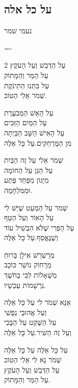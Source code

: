 \documentclass[11pt,twoside]{article}
\newcommand{\instruction}[1]{%
\ifhmode\else\noindent\fi%
{\plain\tiny{#1}}%
}
\begin{document}
{\newpage

\subsection{על כל אלה}
\vspace{-\baselineskip}%
{\centering\instruction{נעמי שמר}\par}
{%
{%
\setlength{\columnseprule}{0.4pt}%
\setlength{\columnsep}{1.8em}%
\lineskiplimit=-\maxdimen%
\begin{multicols}{2}
עַל הַדְּבַשׁ וְעַל הָעֹקֶץ\\
עַל הַמַּר וְהַמָּתוֹק\\
עַל בִּתֵּנוּ הַתִּינֹקֶת\\
שְׁמֹר אֵלִי הַטּוֹב.

עַל הָאֵשׁ הַמְּבֹעֶרֶת\\
עַל הַמַּיִם הַזַּכִּים\\
עַל הָאִישׁ הַשָּׁב הַבַּיְתָה\\
מִן הַמֶּרְחַקִּים.\hfill{\scriptsize עַל כָּל אֵלֶּה}

שְׁמֹר אֵלִי עַל זֶה הַבַּיִת\\
עַל הַגַּן עַל הַחוֹמָה\\
מִיָּגוֹן מִפַּחַד פֶּתַע\\
וּמִמִּלְחָמָה.

שְׁמֹר עַל הַמְּעַט שֶׁיֵּשׁ לִי\\
עַל הָאוֹר וְעַל הַטַּף\\
עַל הַפְּרִי שֶׁלֹּא הִבְשִׁיל עוֹד\\
וְשֶׁנֶּאֱסַף.\hfill{\scriptsize עַל כָּל אֵלֶּה}

מְרַשְׁרֵשׁ אִילָן בָּרוּחַ\\
מֵרָחוֹק נוֹשֵׁר כּוֹכָב\\
מִשְׁאָלוֹת לִבִּי בַּחֹשֶׁךְ\\
נִרְשָׁמוֹת עַכְשָׁיו.

אָנָּא שְׁמֹר לִי עַל כָּל אֵלֶּה\\
וְעַל אֲהוּבֵי נַפְשִׁי\\
עַל הַשֶּׁקֶט עַל הַבֶּכִי\\
וְעַל זֶה הַשִּׁיר.\hfill{\scriptsize עַל כָּל אֵלֶּה}
\end{multicols}%
}

{\centering\large%
עַל כָּל אֵלֶּה עַל כָּל אֵלֶּה\\
שְׁמֹר נָא לִי אֵלִי הַטּוֹב\\
עַל הַדְּבַשׁ וְעַל הָעֹקֶץ\\
עַל הַמַּר וְהַמָּתוֹק.

}}}
\end{document}
